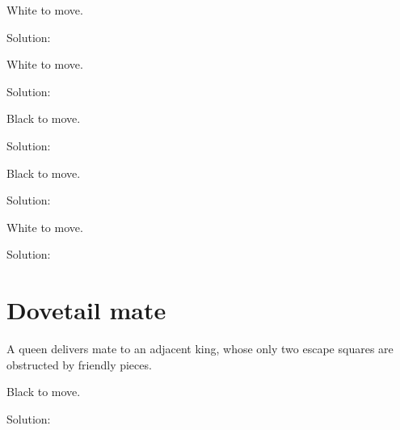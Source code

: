 \documentclass{book}
\begin{document}
\begin{multicols}{2}
\begin{samepage}
\end{samepage}\begin{samepage} 
\newgame 


 
\showboard
 
 White to move. 
 
Solution: 
 
\end{samepage}\begin{samepage} 
\newgame 


 
\showboard
 
 White to move. 
 
Solution: 
 
\end{samepage}\begin{samepage} 
\newgame 


 
\showboard
 
 Black to move. 
 
Solution: 
 
\end{samepage}\begin{samepage} 
\newgame 


 
\showboard
 
 Black to move. 
 
Solution: 
 
\end{samepage}\begin{samepage} 
\newgame 


 
\showboard
 
 White to move. 
 
Solution: 
 
\end{samepage}\end{multicols} 
\newpage 
\section{Dovetail mate}
A queen delivers mate to an adjacent king, whose only two escape squares are obstructed by friendly pieces.\begin{multicols}{2} 
\begin{samepage} 
\newgame 


 
\showboard
 
 Black to move. 
 
Solution: 
 
\end{samepage}\end{multicols} 
\newpage 
\end{document}
